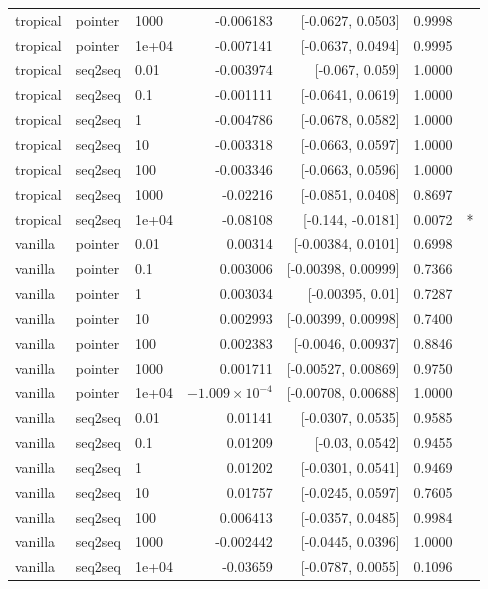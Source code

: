\documentclass[10pt]{article}
\begin{document}
{\begin{longtable}{lllrrrl}
tropical & pointer & 1000 & -0.006183 & [-0.0627, 0.0503] & 0.9998 & \\
tropical & pointer & 1e+04 & -0.007141 & [-0.0637, 0.0494] & 0.9995 & \\
tropical & seq2seq & 0.01 & -0.003974 & [-0.067, 0.059] & 1.0000 & \\
tropical & seq2seq & 0.1 & -0.001111 & [-0.0641, 0.0619] & 1.0000 & \\
tropical & seq2seq & 1 & -0.004786 & [-0.0678, 0.0582] & 1.0000 & \\
tropical & seq2seq & 10 & -0.003318 & [-0.0663, 0.0597] & 1.0000 & \\
tropical & seq2seq & 100 & -0.003346 & [-0.0663, 0.0596] & 1.0000 & \\
tropical & seq2seq & 1000 & -0.02216 & [-0.0851, 0.0408] & 0.8697 & \\
tropical & seq2seq & 1e+04 & -0.08108 & [-0.144, -0.0181] & 0.0072 & *\\
vanilla & pointer & 0.01 & 0.00314 & [-0.00384, 0.0101] & 0.6998 & \\
vanilla & pointer & 0.1 & 0.003006 & [-0.00398, 0.00999] & 0.7366 & \\
vanilla & pointer & 1 & 0.003034 & [-0.00395, 0.01] & 0.7287 & \\
vanilla & pointer & 10 & 0.002993 & [-0.00399, 0.00998] & 0.7400 & \\
vanilla & pointer & 100 & 0.002383 & [-0.0046, 0.00937] & 0.8846 & \\
vanilla & pointer & 1000 & 0.001711 & [-0.00527, 0.00869] & 0.9750 & \\
vanilla & pointer & 1e+04 & $-1.009\times10^{-4}$ & [-0.00708, 0.00688] & 1.0000 & \\
vanilla & seq2seq & 0.01 & 0.01141 & [-0.0307, 0.0535] & 0.9585 & \\
vanilla & seq2seq & 0.1 & 0.01209 & [-0.03, 0.0542] & 0.9455 & \\
vanilla & seq2seq & 1 & 0.01202 & [-0.0301, 0.0541] & 0.9469 & \\
vanilla & seq2seq & 10 & 0.01757 & [-0.0245, 0.0597] & 0.7605 & \\
vanilla & seq2seq & 100 & 0.006413 & [-0.0357, 0.0485] & 0.9984 & \\
vanilla & seq2seq & 1000 & -0.002442 & [-0.0445, 0.0396] & 1.0000 & \\
vanilla & seq2seq & 1e+04 & -0.03659 & [-0.0787, 0.0055] & 0.1096 & \\
\bottomrule
\end{longtable}
}
\end{document}
